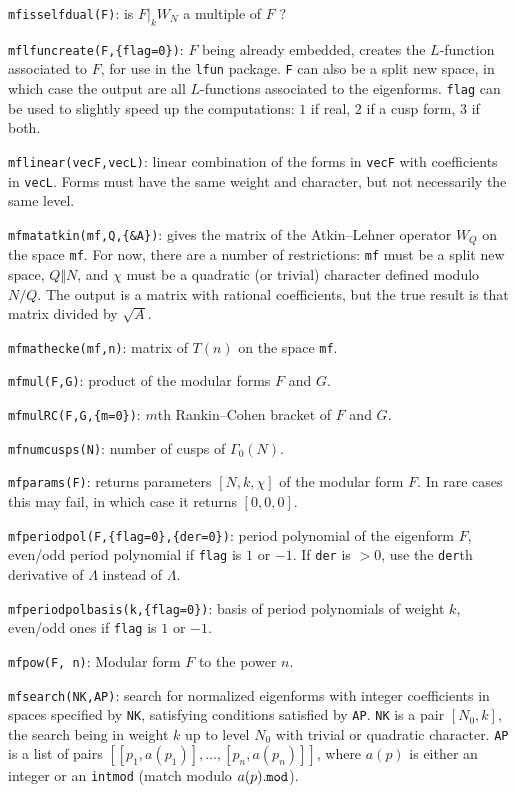 \documentclass[11pt]{article}
\newcommand{\G}{\Gamma}
\def\kbd#1{{\tt #1}}
\begin{document}
\kbd{mfisselfdual(F)}: is $F|_kW_N$ a multiple of $F$ ?

\kbd{mflfuncreate(F,\{flag=0\})}: $F$ being already embedded, creates the
$L$-function associated to $F$, for use in the \kbd{lfun} package.
\kbd{F} can also be a split new space, in which case the output are
all $L$-functions associated to the eigenforms. \kbd{flag} can be used to
slightly speed up the computations: $1$ if real, $2$ if a cusp form,
$3$ if both.

\kbd{mflinear(vecF,vecL)}: linear combination of the forms in \kbd{vecF}
with coefficients in \kbd{vecL}. Forms must have the same weight and
character, but not necessarily the same level.

\kbd{mfmatatkin(mf,Q,\{\&A\})}: gives the matrix of the Atkin--Lehner operator
$W_Q$ on the space \kbd{mf}. For now, there are a number of restrictions:
\kbd{mf} must be a split new space, $Q\Vert N$, and $\chi$ must be a quadratic
(or trivial) character defined modulo $N/Q$. The output is a matrix with
rational coefficients, but the true result is that matrix divided by
$\sqrt{A}$.

\kbd{mfmathecke(mf,n)}: matrix of $T(n)$ on the space \kbd{mf}.

\kbd{mfmul(F,G)}: product of the modular forms $F$ and $G$.

\kbd{mfmulRC(F,G,\{m=0\})}: $m$th Rankin--Cohen bracket of $F$ and $G$.

\kbd{mfnumcusps(N)}: number of cusps of $\G_0(N)$.

\kbd{mfparams(F)}: returns parameters $[N,k,\chi]$ of the modular form $F$.
In rare cases this may fail, in which case it returns $[0,0,0]$.

\kbd{mfperiodpol(F,\{flag=0\},\{der=0\})}: period polynomial of the eigenform
$F$, even/odd period polynomial if \kbd{flag} is $1$ or $-1$. If \kbd{der}
is $>0$, use the \kbd{der}th derivative of $\Lambda$ instead of $\Lambda$.

\kbd{mfperiodpolbasis(k,\{flag=0\})}: basis of period polynomials of weight
$k$, even/odd ones if \kbd{flag} is $1$ or $-1$.

\kbd{mfpow(F, n)}: Modular form $F$ to the power $n$.

\kbd{mfsearch(NK,AP)}: search for normalized eigenforms with
integer coefficients in spaces specified by \kbd{NK}, satisfying conditions
satisfied by \kbd{AP}. \kbd{NK} is a pair $[N_0,k]$, the search being in
weight $k$ up to level $N_0$ with trivial or quadratic character.
\kbd{AP} is a list of pairs $[[p_1,a(p_1)],...,[p_n,a(p_n)]]$, where $a(p)$
is either an integer or an \kbd{intmod} (match modulo $a(p)\kbd{.mod}$).
\end{document}
